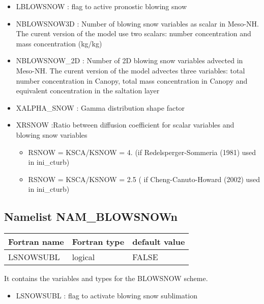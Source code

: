 \begin{itemize}
\item LBLOWSNOW : flag to active pronostic blowing snow 
\item NBLOWSNOW3D : Number of blowing snow variables as scalar in Meso-NH. The curent version of the model use two scalars:
number concentration and mass concentration (kg/kg)
\item NBLOWSNOW\_2D :  Number of 2D blowing snow variables advected in Meso-NH. The curent version of the model advectes three variables: total number concentration in Canopy, total mass concentration in Canopy and equivalent concentration in the saltation layer

\item XALPHA\_SNOW : Gamma distribution shape factor
\item XRSNOW :Ratio between diffusion coefficient for scalar variables and blowing snow variables
\begin{itemize}
	\item RSNOW = KSCA/KSNOW = 4. (if Redelsperger-Sommeria (1981) used in ini\_cturb)
	\item RSNOW = KSCA/KSNOW = 2.5 ( if Cheng-Canuto-Howard (2002) used in ini\_cturb)
\end{itemize}
\end{itemize}

\subsection{Namelist NAM\_BLOWSNOWn }
\begin{center}
\begin{tabular} {|l|l|l|}
\hline
Fortran name & Fortran type & default value \\
\hline

LSNOWSUBL  & logical & FALSE     \\
\hline
\end{tabular}
\end{center}
It contains the variables and types for the BLOWSNOW scheme.

\begin{itemize}
\item  LSNOWSUBL : flag to activate blowing snow sublimation
\end{itemize}



